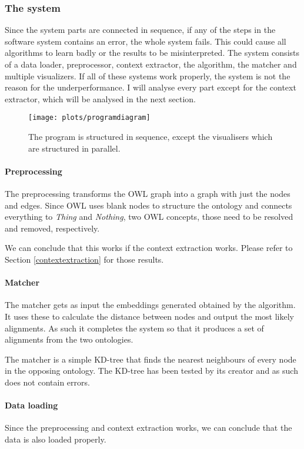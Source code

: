 \documentclass{article}
\begin{document}
  \subsubsection{The system}
  Since the system parts are connected in sequence, if any of the steps in the software system contains an error, the whole system fails. This could cause all algorithms to learn badly or the results to be misinterpreted. The system consists of a data loader, preprocessor, context extractor, the algorithm, the matcher and multiple visualizers. If all of these systems work properly, the system is not the reason for the underperformance. I will analyse every part except for the context extractor, which will be analysed in the next section.
  
  \begin{figure}[H]
  \centering
  \texttt{[image: plots/programdiagram]}
  \label{program}
  \caption[Program diagram]{The program is structured in sequence, except the visualisers which are structured in parallel.}
  \end{figure}
  
  \paragraph{Preprocessing} \label{preprocessing}
  The preprocessing transforms the OWL graph into a graph with just the nodes and edges. Since OWL uses blank nodes to structure the ontology and connects everything to \textit{Thing} and \textit{Nothing}, two OWL concepts, those need to be resolved and removed, respectively.
  
  We can conclude that this works if the context extraction works. Please refer to Section \ref{contextextraction} for those results.
  \paragraph{Matcher} The matcher gets as input the embeddings generated obtained by the algorithm. It uses these to calculate the distance between nodes and output the most likely alignments. As such it completes the system so that it produces a set of alignments from the two ontologies.
  
  The matcher is a simple KD-tree that finds the nearest neighbours of every node in the opposing ontology. The KD-tree has been tested by its creator and as such does not contain errors.
  \paragraph{Data loading}
  Since the preprocessing and context extraction works, we can conclude that the data is also loaded properly.
\end{document}
